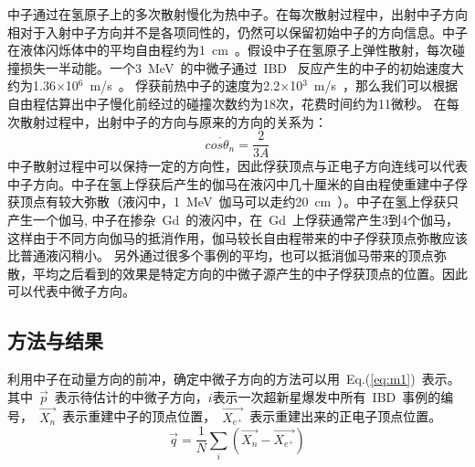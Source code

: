 中子通过在氢原子上的多次散射慢化为热中子。在每次散射过程中，出射中子方向相对于入射中子方向并不是各项同性的，仍然可以保留初始中子的方向信息。中子在液体闪烁体中的平均自由程约为1~cm~。假设中子在氢原子上弹性散射，每次碰撞损失一半动能。一个3~MeV~的中微子通过~IBD~ 反应产生的中子的初始速度大约为1.36$\times$10$^6$~m/s~。 俘获前热中子的速度为2.2$\times$10$^3$~m/s~，那么我们可以根据自由程估算出中子慢化前经过的碰撞次数约为18次，花费时间约为11微秒。 在每次散射过程中，出射中子的方向与原来的方向的关系为：
\begin{equation}\label{eq:flux}
\overline{cos\theta_n}=\frac{2}{3A}
\end{equation}
中子散射过程中可以保持一定的方向性，因此俘获顶点与正电子方向连线可以代表中子方向。中子在氢上俘获后产生的伽马在液闪中几十厘米的自由程使重建中子俘获顶点有较大弥散（液闪中，1~MeV~伽马可以走约20~cm~）。中子在氢上俘获只产生一个伽马, 中子在掺杂~Gd~的液闪中，在~Gd~上俘获通常产生3到4个伽马，这样由于不同方向伽马的抵消作用，伽马较长自由程带来的中子俘获顶点弥散应该比普通液闪稍小。%
另外通过很多个事例的平均，也可以抵消伽马带来的顶点弥散，平均之后看到的效果是特定方向的中微子源产生的中子俘获顶点的位置。因此可以代表中微子方向。
\subsection{方法与结果}
利用中子在动量方向的前冲，确定中微子方向的方法可以用~Eq.(\ref{eq:m1})~表示。其中~$\vec{p}$~表示待估计的中微子方向，$i$表示一次超新星爆发中所有~IBD~事例的编号，~$\overrightarrow{X_{n}}$~表示重建中子的顶点位置，~$\overrightarrow{X_{e^+}}$~表示重建出来的正电子顶点位置。
\begin{equation}\label{eq:m1}
\vec{q} = \frac{1}{N}\sum_{i}(\overrightarrow {X_{n}}-\overrightarrow{X_{e^+}})
\end{equation}

